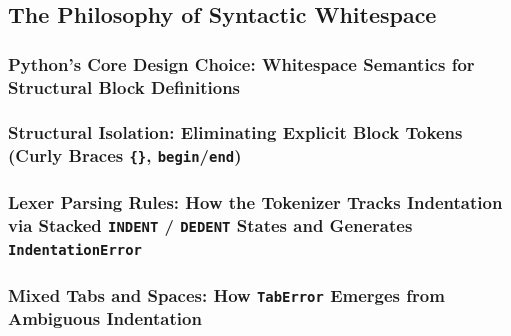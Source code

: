 \subsection{The Philosophy of Syntactic Whitespace}
\subsubsection{Python’s Core Design Choice: Whitespace Semantics for Structural Block Definitions}
\subsubsection{Structural Isolation: Eliminating Explicit Block Tokens (Curly Braces \texttt{\{\}}, \texttt{begin}/\texttt{end})}
\subsubsection{Lexer Parsing Rules: How the Tokenizer Tracks Indentation via Stacked \texttt{INDENT} / \texttt{DEDENT} States and Generates \texttt{IndentationError}}
\subsubsection{Mixed Tabs and Spaces: How \texttt{TabError} Emerges from Ambiguous Indentation}
